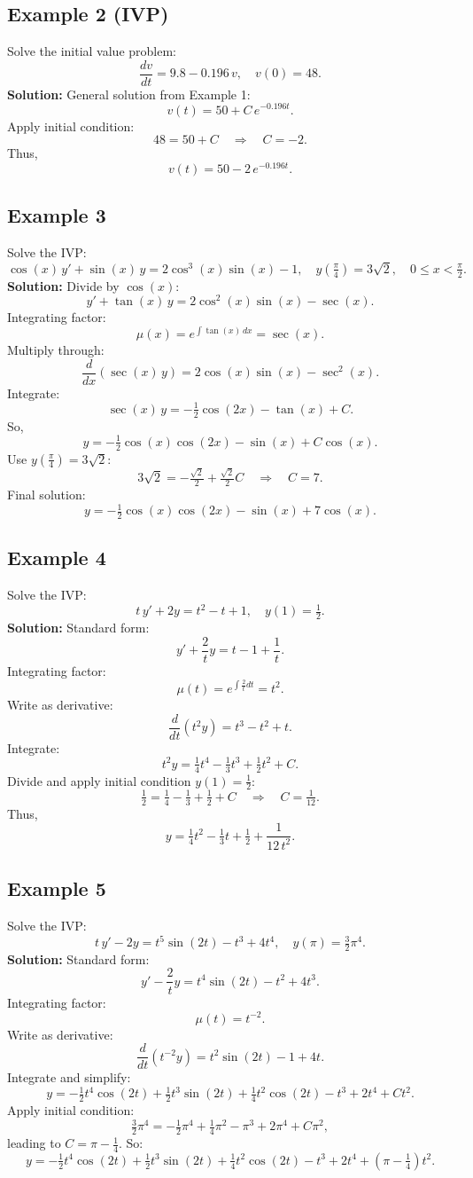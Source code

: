 \documentclass[12pt]{book}
\begin{document}
\subsection*{Example 2 (IVP)}
Solve the initial value problem:
\[
\frac{dv}{dt} = 9.8 - 0.196\,v, \quad v(0) = 48.
\]
\textbf{Solution:}
General solution from Example 1:
\[
v(t) = 50 + C\,e^{-0.196t}.
\]
Apply initial condition:
\[
48 = 50 + C \quad\Longrightarrow\quad C = -2.
\]
Thus,
\[
v(t) = 50 - 2\,e^{-0.196t}.
\]

\subsection*{Example 3}
Solve the IVP:
\[
\cos(x)\,y' + \sin(x)\,y = 2\cos^3(x)\sin(x) - 1, \quad y\!\left(\tfrac{\pi}{4}\right) = 3\sqrt{2}, \quad 0 \le x < \tfrac\pi2.
\]
\textbf{Solution:}
Divide by \(\cos(x)\):
\[
y' + \tan(x)\,y = 2\cos^2(x)\sin(x) - \sec(x).
\]
Integrating factor:
\[
\mu(x) = e^{\int \tan(x)\,dx} = \sec(x).
\]
Multiply through:
\[
\frac{d}{dx}(\sec(x)\,y) = 2\cos(x)\sin(x) - \sec^2(x).
\]
Integrate:
\[
\sec(x)\,y = -\tfrac12\cos(2x) - \tan(x) + C.
\]
So,
\[
y = -\tfrac12 \cos(x)\cos(2x) - \sin(x) + C\cos(x).
\]
Use \(y(\tfrac\pi4) = 3\sqrt2\):
\[
3\sqrt2 = -\tfrac{\sqrt2}{2} + \tfrac{\sqrt2}{2}C \quad\Longrightarrow\quad C = 7.
\]
Final solution:
\[
y = -\tfrac12 \cos(x)\cos(2x) - \sin(x) + 7\cos(x).
\]

\subsection*{Example 4}
Solve the IVP:
\[
t\,y' + 2y = t^2 - t + 1, \quad y(1) = \tfrac12.
\]
\textbf{Solution:}
Standard form:
\[
y' + \frac{2}{t}y = t - 1 + \frac{1}{t}.
\]
Integrating factor:
\[
\mu(t) = e^{\int \frac{2}{t}dt} = t^2.
\]
Write as derivative:
\[
\frac{d}{dt}(t^2 y) = t^3 - t^2 + t.
\]
Integrate:
\[
t^2 y = \tfrac14 t^4 - \tfrac13 t^3 + \tfrac12 t^2 + C.
\]
Divide and apply initial condition \(y(1)=\tfrac12\):
\[
\tfrac12 = \tfrac14 - \tfrac13 + \tfrac12 + C \quad\Longrightarrow\quad C = \tfrac{1}{12}.
\]
Thus,
\[
y = \tfrac14 t^2 - \tfrac13 t + \tfrac12 + \frac{1}{12\,t^2}.
\]

\subsection*{Example 5}
Solve the IVP:
\[
t\,y' - 2y = t^5\sin(2t) - t^3 + 4t^4, \quad y(\pi) = \tfrac{3}{2}\pi^4.
\]
\textbf{Solution:}
Standard form:
\[
y' - \frac{2}{t}y = t^4\sin(2t) - t^2 + 4t^3.
\]
Integrating factor:
\[
\mu(t) = t^{-2}.
\]
Write as derivative:
\[
\frac{d}{dt}(t^{-2} y) = t^2\sin(2t) - 1 + 4t.
\]
Integrate and simplify:
\[
y = -\tfrac12 t^4\cos(2t) + \tfrac12 t^3\sin(2t) + \tfrac14 t^2\cos(2t) - t^3 + 2t^4 + Ct^2.
\]
Apply initial condition:
\[
\tfrac{3}{2}\pi^4 = -\tfrac12\pi^4 + \tfrac14\pi^2 - \pi^3 + 2\pi^4 + C\pi^2,
\]
leading to \(C = \pi - \tfrac14\). So:
\[
y = -\tfrac12 t^4\cos(2t) + \tfrac12 t^3\sin(2t) + \tfrac14 t^2\cos(2t) - t^3 + 2t^4 + \left(\pi - \tfrac14\right)t^2.
\]
\end{document}
